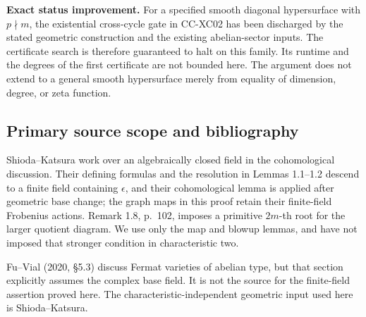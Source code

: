 \textbf{Exact status improvement.} For a specified smooth diagonal
hypersurface with \(p\nmid m\), the existential cross-cycle gate in
CC-XC02 has been discharged by the stated geometric construction and the
existing abelian-sector inputs. The certificate search is therefore
guaranteed to halt on this family. Its runtime and the degrees of the
first certificate are not bounded here. The argument does not extend to
a general smooth hypersurface merely from equality of dimension, degree,
or zeta function.

\subsection{Primary source scope and
bibliography}\label{primary-source-scope-and-bibliography}

Shioda--Katsura work over an algebraically closed field in the
cohomological discussion. Their defining formulas and the resolution in
Lemmas 1.1--1.2 descend to a finite field containing \(\epsilon\), and
their cohomological lemma is applied after geometric base change; the
graph maps in this proof retain their finite-field Frobenius actions.
Remark 1.8, p.~102, imposes a primitive \(2m\)-th root for the larger
quotient diagram. We use only the map and blowup lemmas, and have not
imposed that stronger condition in characteristic two.

Fu--Vial (2020, §5.3) discuss Fermat varieties of abelian type, but that
section explicitly assumes the complex base field. It is not the source
for the finite-field assertion proved here. The
characteristic-independent geometric input used here is Shioda--Katsura.

